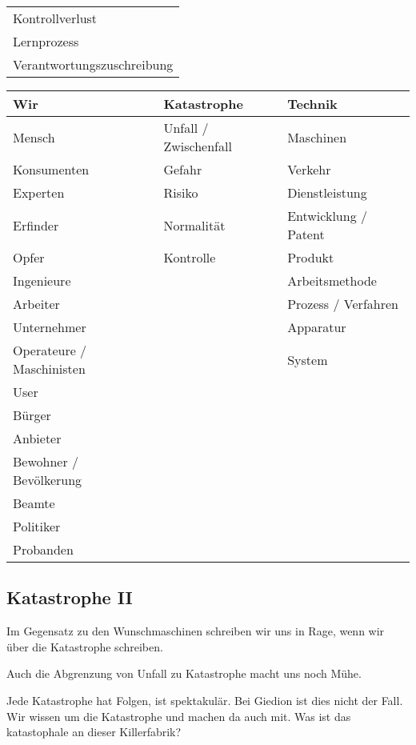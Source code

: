 \documentclass[a4paper,ngerman,11pt]{scrartcl}
\begin{document}
\begin{center}
\begin{tabular}{l}
Kontrollverlust\\
Lernprozess\\
Verantwortungszuschreibung\\
\end{tabular}
\end{center}

\begin{center}
\begin{tabular}{lll}
Wir & Katastrophe & Technik\\
\hline
Mensch & Unfall / Zwischenfall & Maschinen\\
Konsumenten & Gefahr & Verkehr\\
Experten & Risiko & Dienstleistung\\
Erfinder & Normalität & Entwicklung / Patent\\
Opfer & Kontrolle & Produkt\\
Ingenieure &  & Arbeitsmethode\\
Arbeiter &  & Prozess / Verfahren\\
Unternehmer &  & Apparatur\\
Operateure / Maschinisten &  & System\\
User &  & \\
Bürger &  & \\
Anbieter &  & \\
Bewohner / Bevölkerung &  & \\
Beamte &  & \\
Politiker &  & \\
Probanden &  & \\
\end{tabular}
\end{center}


\subsection{Katastrophe II}
\label{sec-2-8}

Im Gegensatz zu den Wunschmaschinen schreiben wir uns in Rage, wenn wir über
die Katastrophe schreiben.

Auch die Abgrenzung von Unfall zu Katastrophe macht uns noch Mühe.

Jede Katastrophe hat Folgen, ist spektakulär. Bei Giedion ist dies nicht der
Fall. Wir wissen um die Katastrophe und machen da auch mit. Was ist das
katastophale an dieser Killerfabrik?
\end{document}

